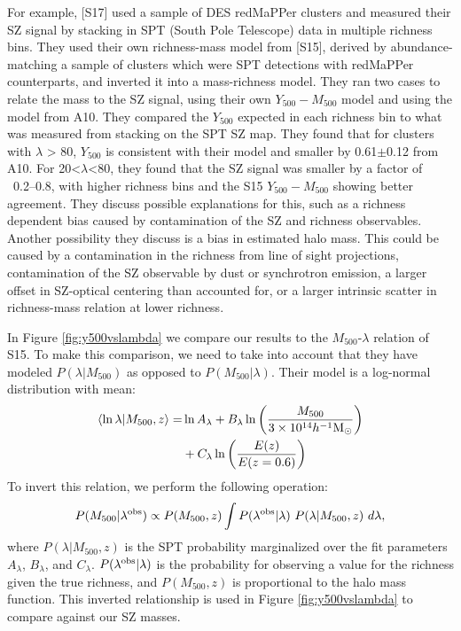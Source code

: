\documentclass[a4paper,fleqn,usenatbib]{mnras}
\begin{document}
For example, \cite{2017MNRAS.468.3347S} [S17] used a sample of DES redMaPPer clusters and measured their SZ signal by stacking in SPT (South Pole Telescope) data in multiple richness bins.  
They used their own richness-mass model from \cite{2015MNRAS.454.2305S} [S15], derived by abundance-matching a sample of clusters which were SPT detections with redMaPPer counterparts, and inverted it into a mass-richness model.
They ran two cases to relate the mass to the SZ signal, using their own $Y_{500} - M_{500}$ model and using the model from A10. 
They compared the $Y_{500}$ expected in each richness bin to what was measured from stacking on the SPT SZ map. They found that for clusters with $\lambda$ > 80, $Y_{500}$ is consistent with their model and smaller by 0.61$\pm$0.12 from A10. 
For 20<$\lambda$<80, they found that the SZ signal was smaller by a factor of ~0.2--0.8, with higher richness bins and the S15 $Y_{500} - M_{500}$ showing better agreement. 
They discuss possible explanations for this, such as a richness dependent bias caused by contamination of the SZ and richness observables. 
Another possibility they discuss is a bias in estimated halo mass. 
This could be caused by a contamination in the richness from line of sight projections, contamination of the SZ observable by dust or synchrotron emission, a larger offset in SZ-optical centering than accounted for, or a larger intrinsic scatter in richness-mass relation at lower richness.

In Figure \ref{fig:y500vslambda} we compare our results to the $M_{500}$-$\lambda$ relation of S15. 
To make this comparison, we need to take into account that they have modeled $P(\lambda|M_{500})$ as opposed to $P(M_{500}|\lambda)$. 
Their model is a log-normal distribution with mean:
\begin{equation}
\begin{split}
\langle \ln\lambda | M_{500},z\rangle = & \ln A_{\lambda} + B_{\lambda} \ln\bigg(\frac{M_{500}}{3 \times 10^{14}h^{-1}\rm M_{\odot}}\bigg) \\ & + C_{\lambda}\ln\bigg(\frac{E(z)}{E(z=0.6)}\bigg)
\end{split}
\end{equation}
To invert this relation, we perform the following operation:
\begin{equation}
P(M_{500}|\lambda^{\rm obs}) \propto P(M_{500},z) \int P(\lambda^{\rm obs}|\lambda) \  P(\lambda|M_{500},z) \ d\lambda,
\end{equation}
where $P(\lambda|M_{500},z)$ is the SPT probability marginalized over the fit parameters $A_{\lambda}$, $B_{\lambda}$, and $C_{\lambda}$. 
$P(\lambda^{\rm obs}|\lambda)$ is the probability for observing a value for the richness given the true richness, and $P(M_{500},z)$ is proportional to the halo mass function. 
This inverted relationship is used in Figure \ref{fig:y500vslambda} to compare against our SZ masses.
\end{document}
